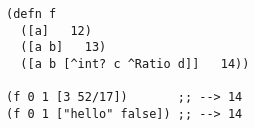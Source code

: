 \begin{lstlisting}[style=reclojureClojure,frame=single]
(defn f
  ([a]   12)
  ([a b]   13)
  ([a b [^int? c ^Ratio d]]   14))

(f 0 1 [3 52/17])       ;; --> 14
(f 0 1 ["hello" false]) ;; --> 14
\end{lstlisting}
